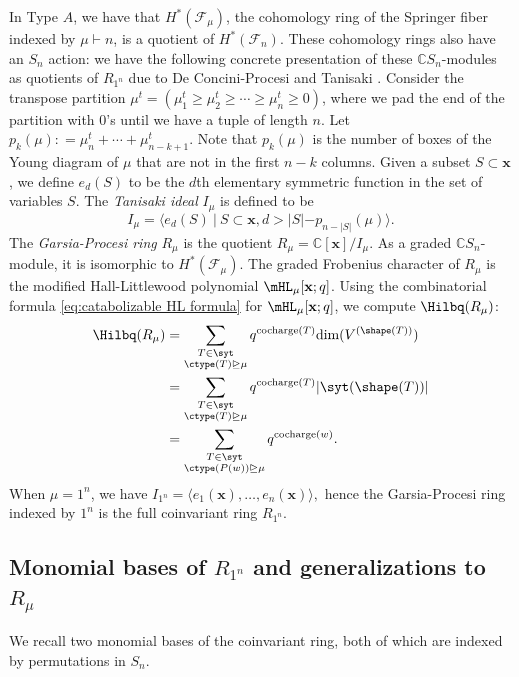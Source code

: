 In Type $A$, we have that $H^{\ast}(\mathcal{F}_\mu)$,  the cohomology ring of the Springer fiber indexed by $\mu\vdash n$, is a quotient of $H^{\ast}(\mathcal{F}_n)$. These cohomology rings also have an $S_n$ action: we have the following concrete presentation of these $\mathbb{C}S_n$-modules as quotients of $R_{1^n}$ due to De Concini-Procesi \cite{deCon-Proc} and Tanisaki \cite{Tanisaki}. 
 Consider the transpose partition $\mu^{t} = (\mu^t_1 \geq \mu^t_2 \geq \cdots \geq  \mu^t_n \geq  0)$, where we pad the end of the partition with $0$'s until we have a tuple of length $n$. Let $p_k (\mu) : =\mu^t_n + \cdots + \mu^t_{n-k+1}$. Note that $p_k(\mu)$ is the number of boxes of the Young diagram of $\mu$ that are not in the first $n-k$ columns.  Given a subset $S\subset \mathbf{x}$, we define $e_d(S)$ to be the $d$th elementary symmetric function in the set of variables  $S$. 
The \textit{Tanisaki ideal} $I_\mu$ is defined to be
\[I_\mu = \langle e_d(S) \ | \ S\subset \mathbf{x}, d> |S| -p_{n-|S|}(\mu) \rangle .\]
The \textit{Garsia-Procesi ring} $R_\mu$ is the quotient  $R_\mu = \mathbb{C}[\mathbf{x}]/I_\mu$.
As a graded $\mathbb{C}S_n$-module, it is isomorphic to $H^{\ast}(\mathcal{F}_\mu)$.
The graded Frobenius character of $R_\mu$ is the modified Hall-Littlewood polynomial $\mHL_{\mu}[\mathbf{x};q]$.
Using the combinatorial formula \eqref{eq:catabolizable HL formula} for $\mHL_{\mu}[\mathbf{x};q]$, we compute $\Hilbq(R_\mu)$:
\begin{align}
     \Hilbq(R_{\mu}) &= \sum\limits_{\substack{T\in \syt\\  \ctype(T)\unrhd\mu}} q^{\text{cocharge}(T)} \text{dim} (V^{(\shape(T))}) \nonumber\\&=  \sum\limits_{\substack{T\in \syt\\  \ctype(T)\unrhd\mu}}  q^{\text{cocharge}(T)} |\syt(\shape(T))| \nonumber \\&=  \sum\limits_{\substack{T\in \syt\\  \ctype(P(w))\unrhd\mu}}  q^{\text{cocharge}(w)}\label{eq:Hilb of R_mu}.
\end{align}
When $\mu = 1^n$, we have $I_{1^n} = \langle e_1(\mathbf{x}),\dots, e_n(\mathbf{x})\rangle,$ hence the Garsia-Procesi ring indexed by $1^n$ is the full coinvariant ring $R_{1^n}$.

\subsection{Monomial bases of \texorpdfstring{$R_{1^n}$}{R\_\{1\^n\}} and generalizations to \texorpdfstring{$R_{\mu}$}{R\_mu}}
We recall two monomial bases of the coinvariant ring, both of which are indexed by permutations in $S_n$.

